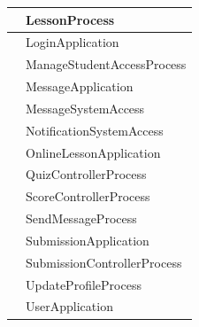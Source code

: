 \documentclass[./../main.tex]{subfiles}
\begin{document}
\begin{longtable}{|p{}|p{}|}
		& LessonProcess               \\ \hline
		& LoginApplication            \\ \hline
		& ManageStudentAccessProcess  \\ \hline
		& MessageApplication          \\ \hline
		& MessageSystemAccess         \\ \hline
		& NotificationSystemAccess    \\ \hline
		& OnlineLessonApplication     \\ \hline
		& QuizControllerProcess       \\ \hline
		& ScoreControllerProcess      \\ \hline
		& SendMessageProcess          \\ \hline
		& SubmissionApplication       \\ \hline
		& SubmissionControllerProcess \\ \hline
		& UpdateProfileProcess        \\ \hline
		& UserApplication             \\ \hline
	\end{longtable}
\end{document}
